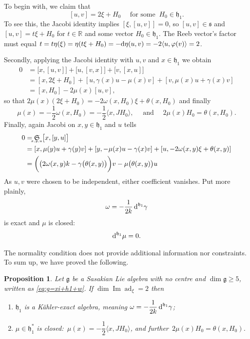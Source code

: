 \documentclass[12pt, twoside]{amsart}
\def\D{\textup{d}}
\def\g{\mathfrak{g}}
\def\h{\mathfrak{h}}
\def\s{\mathfrak s}
\def\R{\mathbb{R}}
\def\ad{\operatorname{ad}}
\renewcommand{\Im}{\operatorname{Im}}
\renewcommand{\geq}{\geqslant}\renewcommand{\leq}{\leqslant}
\newtheorem{prop}[definition]{Proposition}
\theoremstyle{definition}
\begin{document}
To begin with, we claim that 
\begin{equation} \label{[u,v]} 
    [u,v]=2\xi + H_{0}\quad \text{ for some }\ H_{0} \in \h_1.
\end{equation}
To see this, the Jacobi identity implies $[\xi,[u,v]]=0$, so $[u,v] \in \s$ and $[u,v]=t\xi+ H_{0}$ for $t \in \R$ and some vector $H_{0} \in \h_1$. 
The Reeb vector's factor must equal 
$t=t\eta(\xi)= \eta(t\xi + H_{0})= -\D \eta(u,v)= -2\langle u , \varphi (v) \rangle= 2$.

Secondly, applying the Jacobi identity with $u,v$ and $x \in  \h_1$ we obtain
\begin{equation*}\begin{split}
    0 & = \big[x,[u,v]\big]+\big[u,[v, x]\big]+\big[v,[x,u]\big]\\
      &=[x,2\xi +H_{0}]+[u,\gamma(x)u-\mu(x)v]+[v,\mu(x)u+\gamma(x)v]\\
      & = [x,H_{0}]- 2\mu(x) [u,v], 
\end{split}\end{equation*}
so that $ 2\mu(x)(2\xi+H_0)=-2\omega(x,H_0)\xi+ \theta(x,H_0)$ and finally 
\[ \mu(x)=-\frac{1}{2} \omega(x,H_0)=-\frac{1}{2}\langle x , JH_0\rangle,  \quad \text{ and }\quad 2\mu(x)H_0= \theta(x,H_0).\]
%
Finally, again Jacobi on $x,y \in \h_1$ and $u$ tells 
\begin{equation*}\begin{split}
    0 &= \underaccent{x, y, u}{\mathfrak{S}}\ \big[x,[y,u]\big] \\
      &=[x,\mu(y)u+ \gamma(y)v]+[y, -\mu(x)u-\gamma(x)v]+[u,-2\omega(x,y)\xi+\theta(x,y)]\\
      &=\bigg(\big(2\omega(x,y)k-\gamma\big(\theta(x,y)\big)\bigg) v-\mu\big(\theta(x,y)\big)u
\end{split}\end{equation*}
As $u,v$ were chosen to be independent, either coefficient vanishes.
Put more plainly, 
\[ \omega = -\frac{1}{2k}\,\D^{\h_1} \gamma\]  
is exact and $\mu$ is closed: 
\[\D^{\h_1}\mu =0.\]

\medskip

The normality condition does not provide additional information nor constraints. 
To sum up, we have proved the following. 

\begin{prop}\label{prop: compatibilidad}
Let  $\g$ be a Sasakian Lie algebra with no centre and $\dim \g\geq 5$, written as \eqref{eq:g=xi+h1+w}. If $\dim \Im \ad_{\xi}=2$ then 
    \begin{enumerate}
    \item $\h_1$ is a K{\"a}hler-exact algebra, meaning $\omega=- \dfrac{1}{2k}\,\D^{\h_1}\gamma$;
    \item $\mu\in\h_1^*$ is closed:\ $\mu(x)=-\dfrac{1}{2}\langle x,JH_0\rangle$, and further\  $2\mu(x)H_0= \theta(x,H_0)$.\hfill 
\end{enumerate}
\end{prop}
\end{document}
